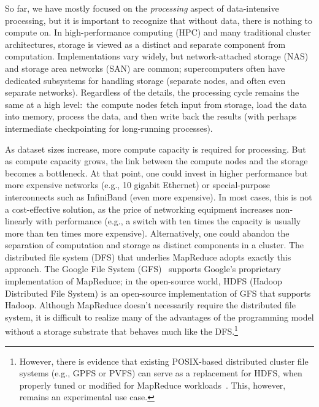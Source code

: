 So far, we have mostly focused on the \emph{processing} aspect of
data-intensive processing, but it is important to recognize that
without data, there is nothing to compute on.  In high-performance
computing (HPC) and many traditional cluster architectures, storage is
viewed as a distinct and separate component from computation.
Implementations vary widely, but network-attached storage (NAS) and
storage area networks (SAN) are common; supercomputers often have
dedicated subsystems for handling storage (separate nodes, and often
even separate networks).  Regardless of the details, the processing
cycle remains the same at a high level:\ the compute nodes fetch input
from storage, load the data into memory, process the data, and then
write back the results (with perhaps intermediate checkpointing for
long-running processes).

As dataset sizes increase, more compute capacity is required for
processing.  But as compute capacity grows, the link between the
compute nodes and the storage becomes a bottleneck.  At that point,
one could invest in higher performance but more expensive networks
(e.g., 10 gigabit Ethernet) or special-purpose interconnects such as
InfiniBand (even more expensive).  In most cases, this is not a
cost-effective solution, as the price of networking equipment
increases non-linearly with performance (e.g., a switch with ten times
the capacity is usually more than ten times more expensive).
Alternatively, one could abandon the separation of computation and
storage as distinct components in a cluster.  The distributed file
system (DFS) that underlies MapReduce adopts exactly this approach.
The Google File System (GFS)~\cite{Ghemawat_etal_SOSP2003} supports
Google's proprietary implementation of MapReduce; in the open-source
world, HDFS (Hadoop Distributed File System) is an open-source
implementation of GFS that supports Hadoop.  Although MapReduce
doesn't necessarily require the distributed file system, it is
difficult to realize many of the advantages of the programming model
without a storage substrate that behaves much like the
DFS.\footnote{However, there is evidence that existing POSIX-based
distributed cluster file systems (e.g., GPFS or PVFS) can serve as a
replacement for HDFS, when properly tuned or modified for MapReduce
workloads~\cite{Tantisiriroj_etal_2008,Ananthanarayanan_etal_2009}.
This, however, remains an experimental use case.}


